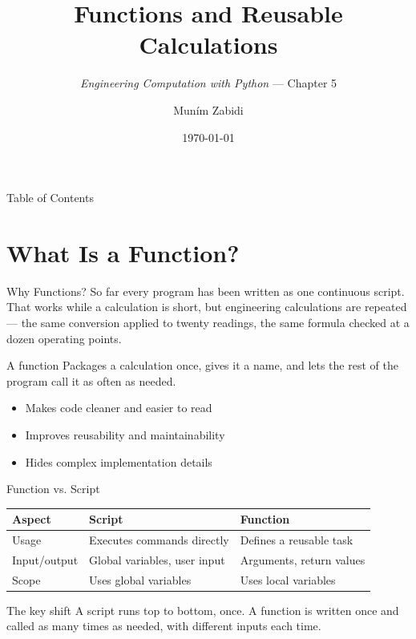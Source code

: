 \documentclass[9pt,aspectratio=169,xcolor=table]{beamer}
\title{Functions and Reusable Calculations}
\subtitle{\emph{Engineering Computation with Python} --- Chapter 5}
\author{Mun\'{i}m Zabidi}
\institute{\color{primary}Faculty of Electrical Engineering, Universiti Teknologi Malaysia}
\date{\today}
\newcommand{\striped}{\rowcolors{1}{white}{stripe}}
\begin{document}
\titlepage

\begin{frame}{Table of Contents}
    \tableofcontents
\end{frame}

\section{What Is a Function?}

\begin{frame}{Why Functions?}
    \leavevmode
    So far every program has been written as one continuous script. That
    works while a calculation is short, but engineering calculations are
    \alert{repeated} --- the same conversion applied to twenty readings,
    the same formula checked at a dozen operating points.

    \vspace{3mm}
    \begin{block}{A function}
        Packages a calculation once, gives it a name, and lets the rest
        of the program call it as often as needed.
    \end{block}

    \vspace{2mm}
    \begin{itemize}\small
        \item Makes code cleaner and easier to read
        \item Improves reusability and maintainability
        \item Hides complex implementation details
    \end{itemize}
\end{frame}

\begin{frame}{Function vs. Script}
    \leavevmode
    \small
    \striped
    \begin{center}
    \begin{tabular}{lll}
        \toprule
        \textbf{Aspect} & \textbf{Script} & \textbf{Function} \\
        \midrule
        Usage & Executes commands directly & Defines a reusable task \\
        Input/output & Global variables, user input & Arguments, return values \\
        Scope & Uses global variables & Uses local variables \\
        \bottomrule
    \end{tabular}
    \end{center}

    \vspace{4mm}
    \begin{alertblock}{The key shift}
        A script runs top to bottom, once. A function is written once
        and \alert{called} as many times as needed, with different
        inputs each time.
    \end{alertblock}
\end{frame}
\end{document}
